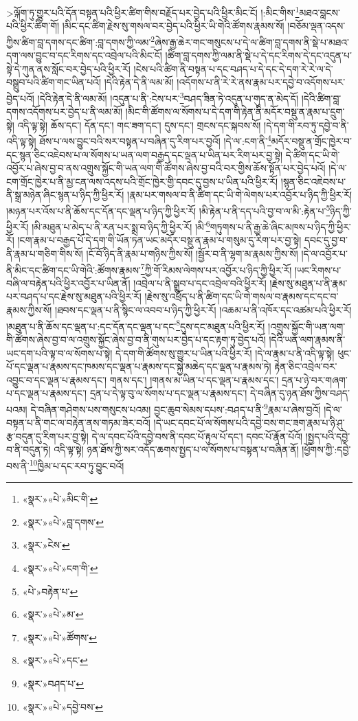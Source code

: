 >ལྐོག་ཏུ་གྱུར་པའི་དོན་བསྟན་པའི་ཕྱིར་ཚིག་གིས་བརྗོད་པར་བྱེད་པའི་ཕྱིར་མིང་ངོ། །:མིང་གིས་\footnote{«སྣར་»«པེ་»མིང་གི་}མཐའ་བླངས་པའི་ཕྱིར་ཚིག་གོ། །མིང་དང་ཚིག་རྗེས་སུ་གསལ་བར་བྱེད་པའི་ཕྱིར་ཡི་གེའི་ཚོགས་རྣམས་སོ། །བཅོམ་ལྡན་འདས་ཀྱིས་ཚིག་བླ་དགས་དང་ཚིག་:བླ་དགས་ཀྱི་ལམ་\footnote{«སྣར་»«པེ་»བླ་དགས་}ཞེས་རྒྱ་ཆེར་གང་གསུངས་པ་དེ་ལ་ཚིག་བླ་དགས་ནི་སྡེ་པ་མཐའ་དག་ལས་བྱུང་བ་དང་རིགས་དང་འབྲེལ་པའི་མིང་ངོ། །ཚིག་བླ་དགས་ཀྱི་ལམ་ནི་སྡེ་པ་དེ་དང་རིགས་དེ་དང་འདུན་པ་སྟེ་དེ་ཀུན་ནས་སློང་བར་བྱེད་པའི་ཕྱིར་རོ། །ངེས་པའི་ཚིག་ནི་བསྟན་པ་དང་བཤད་པ་དེ་དང་དེ་དག་རེ་རེ་ལ་དེ་བསྒྲུབ་པའི་ཚིག་གང་ཡིན་པའོ། །དེའི་རྟེན་དེ་ནི་ལམ་མོ། །འདོགས་པ་ནི་རེ་རེ་ནས་རྣམ་པར་དབྱེ་བ་འདོགས་པར་བྱེད་པའོ། །དེའི་རྟེན་དེ་ནི་ལམ་མོ། །འདུན་པ་ནི་:ངེས་པར་\footnote{«སྣར་»ངེས་}བཤད་ཟིན་ཏེ་འདུན་པ་གུད་ན་མེད་དོ། །དེའི་ཚིག་བླ་དགས་འདོགས་པར་བྱེད་པ་ནི་ལམ་མོ། །མིང་གི་ཚོགས་ལ་སོགས་པ་དེ་དག་གི་རྟེན་ནི་མདོར་བསྡུ་ན་རྣམ་པ་དྲུག་སྟེ། འདི་ལྟ་སྟེ། ཆོས་དང་། དོན་དང་། གང་ཟག་དང་། དུས་དང་། གྲངས་དང་སྐབས་སོ། །དེ་དག་གི་རབ་ཏུ་དབྱེ་བ་ནི་འདི་ལྟ་སྟེ། ཐོས་པ་ལས་བྱུང་བའི་སར་བསྟན་པ་བཞིན་དུ་རིག་པར་བྱའོ། །དེ་ལ་:ངག་ནི་\footnote{«སྣར་»«པེ་»ངག་གི་}མདོར་བསྡུ་ན་གྲོང་ཁྱེར་བ་དང་སྙན་ཅིང་འཇེབས་པ་ལ་སོགས་པ་ཡན་ལག་བརྒྱད་དང་ལྡན་པ་ཡིན་པར་རིག་པར་བྱ་སྟེ། དེ་ཚིག་དང་ཡི་གེ་འབྱོར་པ་ཞེས་བྱ་བ་ནས་འགྲུས་སྐྱོང་གི་ཡན་ལག་གི་ཚོགས་ཞེས་བྱ་བའི་བར་གྱིས་ཆོས་སྟོན་པར་བྱེད་པའོ། །དེ་ལ་ངག་གྲོང་ཁྱེར་པ་ནི་མྱ་ངན་ལས་འདས་པའི་གྲོང་ཁྱེར་གྱི་དབང་དུ་བྱས་པ་ཡིན་པའི་ཕྱིར་རོ། །སྙན་ཅིང་འཇེབས་པ་ནི་སྒྲ་མཉེན་ཞིང་སྙན་པ་ཉིད་ཀྱི་ཕྱིར་རོ། །རྣམ་པར་གསལ་བ་ནི་ཚིག་དང་ཡི་གེ་ལེགས་པར་འབྱོར་པ་ཉིད་ཀྱི་ཕྱིར་རོ། །མཉན་པར་འོས་པ་ནི་ཆོས་དང་དོན་དང་ལྡན་པ་ཉིད་ཀྱི་ཕྱིར་རོ། །མི་རྟེན་པ་ནི་དད་པའི་བྱ་བ་ལ་མི་:རྟེན་པ་\footnote{«པེ་»བརྟེན་པ་}ཉིད་ཀྱི་ཕྱིར་རོ། །མི་མཐུན་པ་མེད་པ་ནི་རན་པར་སྨྲ་བ་ཉིད་ཀྱི་ཕྱིར་རོ། །མི་\footnote{«སྣར་»«པེ་»མ་}གཏུགས་པ་ནི་རྒྱ་ཆེ་ཞིང་མཁས་པ་ཉིད་ཀྱི་ཕྱིར་རོ། །ངག་རྣམ་པ་བརྒྱད་པོ་དེ་དག་གི་ཡོན་ཏན་ཡང་མདོར་བསྡུ་ན་རྣམ་པ་གསུམ་དུ་རིག་པར་བྱ་སྟེ། དབང་དུ་བྱ་བ་ནི་རྣམ་པ་གཅིག་གིས་སོ། །ངོ་བོ་ཉིད་ནི་རྣམ་པ་གཉིས་ཀྱིས་སོ། །སྦྱོར་བ་ནི་ལྷག་མ་རྣམས་ཀྱིས་སོ། །དེ་ལ་འབྱོར་པ་ནི་མིང་དང་ཚིག་དང་ཡི་གེའི་:ཚོགས་རྣམས་\footnote{«སྣར་»«པེ་»ཚོགས་}ཀྱི་གོ་རིམས་ལེགས་པར་འབྱོར་པ་ཉིད་ཀྱི་ཕྱིར་རོ། །ཡང་རིགས་པ་བཞི་ལ་བརྟེན་པའི་ཕྱིར་འབྱོར་པ་ཡིན་ནོ། །འབྲེལ་པ་ནི་སྒྲུབ་པ་དང་འབྲེལ་བའི་ཕྱིར་རོ། །རྗེས་སུ་མཐུན་པ་ནི་རྣམ་པར་བཤད་པ་དང་རྗེས་སུ་མཐུན་པའི་ཕྱིར་རོ། །རྗེས་སུ་འཕྲོད་པ་ནི་ཚིག་དང་ཡི་གེ་གསལ་བ་རྣམས་དང་དང་བ་རྣམས་ཀྱིས་སོ། །ཐབས་དང་ལྡན་པ་ནི་སྙིང་ལ་འབབ་པ་ཉིད་ཀྱི་ཕྱིར་རོ། །འཆམ་པ་ནི་འཁོར་དང་འཚམ་པའི་ཕྱིར་རོ། །མཐུན་པ་ནི་ཆོས་དང་ལྡན་པ་:དང་དོན་དང་ལྡན་པ་དང་\footnote{«སྣར་»«པེ་»དང་}དུས་དང་མཐུན་པའི་ཕྱིར་རོ། །འགྲུས་སྐྱོང་གི་ཡན་ལག་གི་ཚོགས་ཞེས་བྱ་བ་ལ་འགྲུས་སྐྱོང་ཞེས་བྱ་བ་ནི་གུས་པར་བྱེད་པ་དང་རྟག་ཏུ་བྱེད་པའོ། །དེའི་ཡན་ལག་རྣམས་ནི་ཡང་དག་པའི་ལྟ་བ་ལ་སོགས་པ་སྟེ། དེ་དག་གི་ཚོགས་སུ་གྱུར་པ་ཡིན་པའི་ཕྱིར་རོ། །དེ་ལ་རྣམ་པ་ནི་འདི་ལྟ་སྟེ། ཕུང་པོ་དང་ལྡན་པ་རྣམས་དང་ཁམས་དང་ལྡན་པ་རྣམས་དང་སྐྱེ་མཆེད་དང་ལྡན་པ་རྣམས་ཏེ། རྟེན་ཅིང་འབྲེལ་བར་འབྱུང་བ་དང་ལྡན་པ་རྣམས་དང་། གནས་དང་། །གནས་མ་ཡིན་པ་དང་ལྡན་པ་རྣམས་དང་། དྲན་པ་ཉེ་བར་གཞག་པ་དང་ལྡན་པ་རྣམས་དང་། དྲན་པ་དེ་ལྟ་བུ་ལ་སོགས་པ་དང་ལྡན་པ་རྣམས་དང་། དེ་བཞིན་དུ་ཉན་ཐོས་ཀྱིས་བཤད་པའམ། དེ་བཞིན་གཤེགས་པས་གསུངས་པའམ། བྱང་ཆུབ་སེམས་དཔས་:བཤད་པ་ནི་\footnote{«སྣར་»བཤད་པ་}རྣམ་པ་ཞེས་བྱའོ། །དེ་ལ་བསྟན་པ་ནི་གང་ལ་བརྟེན་ནས་གཏམ་ཟེར་བའོ། །དེ་ཡང་དབང་པོ་ལ་སོགས་པའི་དབྱེ་བས་གང་ཟག་རྣམ་པ་ཉི་ཤུ་རྩ་བདུན་དུ་རིག་པར་བྱ་སྟེ། དེ་ལ་དབང་པོའི་དབྱེ་བས་ནི་དབང་པོ་རྟུལ་པོ་དང་། དབང་པོ་རྣོན་པོའོ། །སྤྱད་པའི་དབྱེ་བ་ནི་བདུན་ཏེ། འདི་ལྟ་སྟེ། ཉན་ཐོས་ཀྱི་སར་འདོད་ཆགས་སྤྱད་པ་ལ་སོགས་པ་བསྟན་པ་བཞིན་ནོ། །ཕྱོགས་ཀྱི་:དབྱེ་བས་ནི་\footnote{«སྣར་»«པེ་»དབྱེ་བས་}ཁྱིམ་པ་དང་རབ་ཏུ་བྱུང་བའོ། 